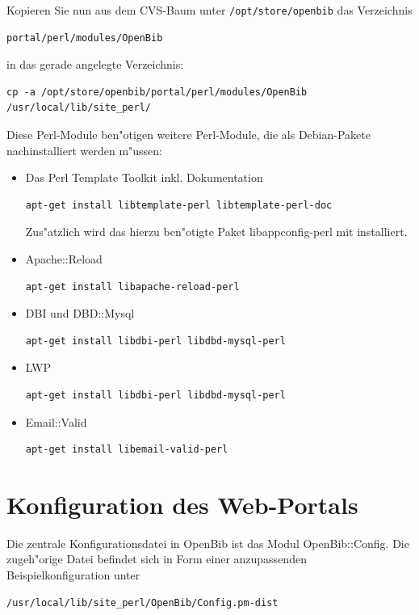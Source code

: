 \documentclass[11pt, twoside, a4paper, BCOR8mm, DIV12, bibtotoc,idxtotoc]{scrbook}
\begin{document}
Kopieren Sie nun aus dem CVS-Baum unter \texttt{/opt/store/openbib}
das Verzeichnis 

\begin{verbatim}
portal/perl/modules/OpenBib
\end{verbatim}

in das gerade angelegte Verzeichnis:

\begin{verbatim}
cp -a /opt/store/openbib/portal/perl/modules/OpenBib /usr/local/lib/site_perl/
\end{verbatim}

Diese Perl-Module ben"otigen weitere Perl-Module, die als
Debian-Pakete nachinstalliert werden m"ussen:

\begin{itemize}
\item Das Perl Template Toolkit inkl. Dokumentation
\begin{verbatim}
apt-get install libtemplate-perl libtemplate-perl-doc
\end{verbatim}
  Zus"atzlich wird das hierzu ben"otigte Paket libappconfig-perl mit
  installiert.
\item Apache::Reload
\begin{verbatim}
apt-get install libapache-reload-perl
\end{verbatim}
\item DBI und DBD::Mysql
\begin{verbatim}
apt-get install libdbi-perl libdbd-mysql-perl
\end{verbatim}
\item LWP
\begin{verbatim}
apt-get install libdbi-perl libdbd-mysql-perl
\end{verbatim}
\item Email::Valid
\begin{verbatim}
apt-get install libemail-valid-perl
\end{verbatim}
\end{itemize}

\section{Konfiguration des Web-Portals}
\label{sec:confportal}

Die zentrale Konfigurationsdatei in OpenBib ist das Modul
OpenBib::Config. Die zugeh"orige Datei befindet sich in Form einer
anzupassenden Beispielkonfiguration unter 

\begin{verbatim}
/usr/local/lib/site_perl/OpenBib/Config.pm-dist
\end{verbatim}
\end{document}
